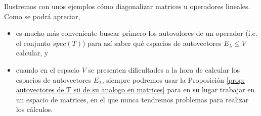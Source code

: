 Ilustremos con unos ejemplos cómo diagonalizar matrices u operadores lineales.
Como se podrá apreciar,
\begin{itemize}
	\item es mucho más conveniente buscar primero los autovalores de
	un operador (i.e. el conjunto $spec(T)$)
	para así saber qué espacios de autovectores 
	$E_{\lambda} \leq V$	
	calcular, y
	\item cuando en el espacio $V$ se presenten dificultades a la 
	hora de calcular los espacios de autovectores $E_{\lambda}$,
	siempre podremos usar la Proposición
	\ref{prop: autovectores de T sii de su analogo en matrices} para
	en su lugar trabajar en un espacio de matrices, en el que nunca
	tendremos problemas para realizar los cálculos.
\end{itemize}

